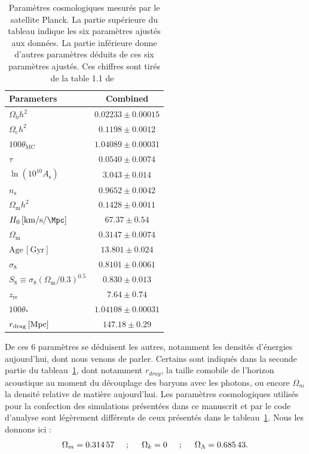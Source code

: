 \documentclass[11pt, twoside, a4paper, openright]{report}
\begin{document}
\begin{table}[h]
  \centering
  \caption{Paramètres cosmologiques mesurés par le satellite Planck. La partie supérieure du tableau indique les six paramètres ajustés aux données. La partie inférieure donne d'autres paramètres déduits de ces six paramètres ajustés. Ces chiffres sont tirés de la table 1.1 de~\cite{Collaboration2018}}
  \label{table:planck2018}
  \begin{tabular}{lc}
    \toprule
    Parameters & Combined \\
    \midrule
    $\Omega_{\mathrm{b}}h^2$\dotfill & $0.02233\pm0.00015$ \\
    $\Omega_{\mathrm{c}}h^2$\dotfill & $0.1198\pm0.0012$ \\
    $100\theta_{\mathrm{MC}}$\dotfill & $1.04089\pm0.00031$ \\
    $\tau$\dotfill & $0.0540\pm0.0074$ \\
    $\ln(10^{10}A_\mathrm{s})$\dotfill & $3.043\pm0.014$ \\
    $n_\mathrm{s}$\dotfill & $0.9652\pm0.0042$ \\
    \midrule
    $\Omega_{\mathrm{m}} h^2$\dotfill & $ 0.1428\pm 0.0011 $ \\
    $H_0 \,[\si{\kilo\meter\per\second\per\Mpc}]$\dotfill & $67.37\pm0.54$ \\
    $\Omega_{\mathrm{m}}$\dotfill & $0.3147\pm0.0074$ \\
    $\mathrm{Age}\, [\mathrm{Gyr}]$\dotfill  & $13.801\pm0.024$ \\
    $\sigma_8$\dotfill & $0.8101\pm0.0061$ \\
    $S_8\equiv \sigma_8 (\Omega_{\mathrm{m}}/0.3)^{0.5}$\dotfill & $0.830\pm0.013$ \\
    $z_{\mathrm{re}}$\dotfill & $7.64\pm0.74$ \\
    $100\theta_\ast$\dotfill & $1.04108\pm0.00031$ \\
    $r_{\mathrm{drag}} \,[{\rm Mpc}]$\dotfill & $147.18\pm0.29$ \\
    \bottomrule
  \end{tabular}
\end{table}

De ces 6 paramètres se déduisent les autres, notamment les densités d'énergies aujourd'hui, dont nous venons de parler. Certains sont indiqués dans la seconde partie du tableau~\ref{table:planck2018},
dont notamment $r_{drag}$, la taille comobile de l'horizon acoustique au moment du découplage des baryons avec les photons,
ou encore $\Omega_m$ la densité relative de matière aujourd'hui. Les paramètres cosmologiques utilisés pour la confection des simulations présentées dans ce manuscrit et par le code d'analyse \picca{} sont légèrement différents de ceux présentés dans le tableau~\ref{table:planck2018}. Nous les donnons ici :
\begin{equation}
  \label{eq:par_cosmo}
  \Omega_m = \num{0.31457} \hspace{0.5cm} ; \hspace{0.5cm} \Omega_k = \num{0} \hspace{0.5cm} ; \hspace{0.5cm} \Omega_{\Lambda} = \num{0.68543} .
\end{equation}
\end{document}
